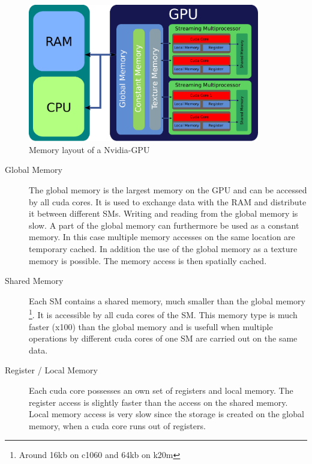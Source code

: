\begin{figure}[!tbp]
      \centering
        \includegraphics[width=0.9\textwidth]{gfx/cuda/gpu.pdf}
          \caption{Memory layout of a Nvidia-GPU}
    \label{fig:gpu_memory_layout}
\end{figure}

\begin{description}
    \item[Global Memory] The global memory is the largest memory on the GPU and can be accessed by all cuda cores.
                         It is  used to exchange data with the RAM and distribute it between different SMs.
                         Writing and reading from the global memory is slow. A part of the global memory can furthermore be used as a constant memory.
                         In this case multiple memory accesses on the same location are temporary cached.
                         In addition the use of the global memory as a texture memory is possible. The memory access is then spatially cached.


    \item[Shared Memory] Each SM contains a shared memory, much smaller than the global memory \footnote{Around 16kb on c1060 and 64kb on k20m}. It is accessible
                         by all cuda cores of the SM.
                         This memory type is much faster (x100) than the global memory and is usefull when multiple operations
                         by different cuda cores of one SM are carried out on the same data.

    \item[Register / Local Memory] Each cuda core possesses an own set of registers and local memory.
                                   The register access is slightly faster than the access  on the shared memory.
                                   Local memory access is very slow since the storage is
                                    created on the global memory, when a cuda core runs out of registers.
\end{description}

